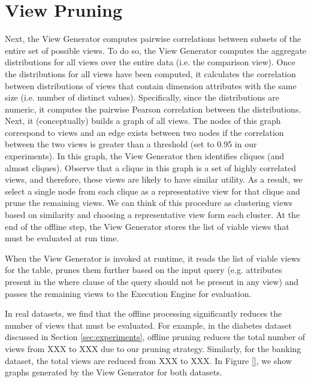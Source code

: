 \section{View Pruning}
\label{sec:view_pruning}
Next, the View Generator computes pairwise correlations between subsets of the
entire set of possible views.
To do so, the View Generator computes the aggregate distributions for all views
over the entire data (i.e. the comparison view). 
Once the distributions for all views have been computed, it calculates the
correlation between distributions of views that contain dimension attributes
with the same size (i.e. number of distinct values).
Specifically, since the distributions are numeric, it computes the pairwise
Pearson correlation between the distributions.
Next, it (conceptually) builds a graph of all views. 
The nodes of this graph correspond to views and an edge exists between two nodes
if the correlation between the two views is greater than a threshold (set to 0.95 in
our experiments). 
In this graph, the View Generator then identifies cliques (and almost cliques).
Observe that a clique in this graph is a set of highly correlated views,
and therefore, these views are likely to have similar utility. 
As a result, we select a
single node from each clique as a representative view for that clique and
prune the remaining views. 
We can think of this procedure as clustering views based on similarity and
choosing a representative view form each cluster.
At the end of the offline step, the View Generator stores the list of
viable views that must be evaluated at run time.

When the View Generator is invoked at runtime, it reads the list of viable
views for the table, prunes them further based on the input query (e.g.
attributes present in the where clause of the query should not be present in
any view) and passes the remaining views to the Execution Engine for
evaluation.

In real datasets, we find that the offline processing significantly
reduces the number of views that must be evaluated. 
For example, in the
diabetes dataset discussed in Section \ref{sec:experiments}, offline pruning
reduces the total number of views from XXX to XXX due to our pruning
strategy. Similarly, for the banking dataset, the total views are
reduced from XXX to XXX. In Figure \ref{}, we show graphs generated by the
View Generator for both datasets.

